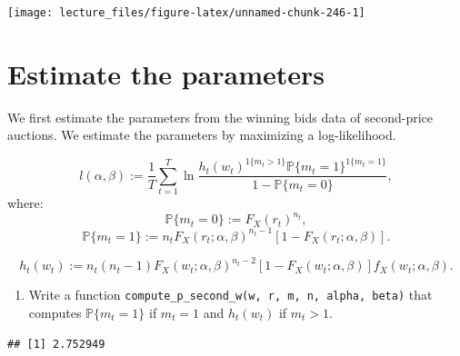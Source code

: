 \documentclass[
]{book}
\newenvironment{Shaded}{\begin{snugshade}}{\end{snugshade}}
\newcommand{\CommentTok}[1]{\textcolor[rgb]{0.56,0.35,0.01}{\textit{#1}}}
\newcommand{\DecValTok}[1]{\textcolor[rgb]{0.00,0.00,0.81}{#1}}
\newcommand{\FunctionTok}[1]{\textcolor[rgb]{0.00,0.00,0.00}{#1}}
\newcommand{\NormalTok}[1]{#1}
\newcommand{\OtherTok}[1]{\textcolor[rgb]{0.56,0.35,0.01}{#1}}
\newcommand{\SpecialCharTok}[1]{\textcolor[rgb]{0.00,0.00,0.00}{#1}}
\providecommand{\tightlist}{%
  \setlength{\itemsep}{0pt}\setlength{\parskip}{0pt}}
\begin{document}
\begin{center}\texttt{[image: lecture\_files/figure-latex/unnamed-chunk-246-1]} \end{center}

\hypertarget{estimate-the-parameters-5}{%
\section{Estimate the parameters}\label{estimate-the-parameters-5}}

We first estimate the parameters from the winning bids data of second-price auctions. We estimate the parameters by maximizing a log-likelihood.

\[
l(\alpha, \beta) := \frac{1}{T} \sum_{t = 1}^T \ln\frac{h_t(w_t)^{1\{m_t > 1\}} \mathbb{P}\{m_t = 1\}^{1\{m_t = 1\}}}{1 - \mathbb{P}\{m_t = 0\}},
\]
where:
\[
\mathbb{P}\{m_t = 0\} := F_X(r_t)^{n_t},
\]
\[
\mathbb{P}\{m_t = 1\} := n_t F_X(r_t; \alpha, \beta)^{n_t - 1} [1 - F_X(r_t; \alpha, \beta)].
\]

\[
h_t(w_t) := n_t (n_t - 1) F_X(w_t; \alpha, \beta)^{n_t - 2} [1 - F_X(w_t; \alpha, \beta)] f_X(w_t; \alpha, \beta).
\]

\begin{enumerate}
\def\labelenumi{\arabic{enumi}.}
\tightlist
\item
  Write a function \texttt{compute\_p\_second\_w(w,\ r,\ m,\ n,\ alpha,\ beta)} that computes \(\mathbb{P}\{m_t = 1\}\) if \(m_t = 1\) and \(h_t(w_t)\) if \(m_t > 1\).
\end{enumerate}

\begin{Shaded}
\end{Shaded}

\begin{verbatim}
## [1] 2.752949
\end{verbatim}
\end{document}
